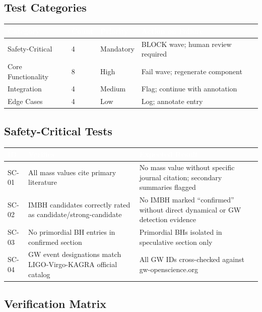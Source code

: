 \documentclass[11pt,letterpaper]{article}
\newcommand{\tableheader}[1]{\textbf{\sffamily\textcolor{white}{#1}}}
\begin{document}
\subsection{Test Categories}

\begin{center}
\begin{tabularx}{\textwidth}{L{3.5cm}C{1.5cm}C{2cm}X}
\toprule
{}
\tableheader{Category} & \tableheader{Count} & \tableheader{Priority} & \tableheader{Action on Failure} \\
\midrule
Safety-Critical & 4 & Mandatory & BLOCK wave; human review required \\
Core Functionality & 8 & High & Fail wave; regenerate component \\
Integration & 4 & Medium & Flag; continue with annotation \\
Edge Cases & 4 & Low & Log; annotate entry \\
\bottomrule
\end{tabularx}
\end{center}

\subsection{Safety-Critical Tests}

\begin{center}
\begin{tabularx}{\textwidth}{C{1.2cm}L{4cm}X}
\toprule
{}
\tableheader{ID} & \tableheader{Verifies} & \tableheader{Expected Result} \\
\midrule
SC-01 & All mass values cite primary literature & No mass value without specific journal citation; secondary summaries flagged \\
SC-02 & IMBH candidates correctly rated as candidate/strong-candidate & No IMBH marked ``confirmed'' without direct dynamical or GW detection evidence \\
SC-03 & No primordial BH entries in confirmed section & Primordial BHs isolated in speculative section only \\
SC-04 & GW event designations match LIGO-Virgo-KAGRA official catalog & All GW IDs cross-checked against gw-openscience.org \\
\bottomrule
\end{tabularx}
\end{center}

\subsection{Verification Matrix}
\end{document}
